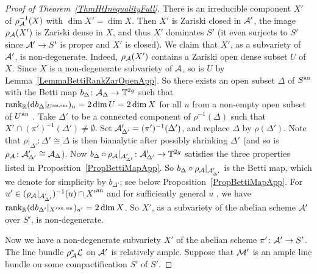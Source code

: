 \begin{proof}[Proof of Theorem~\ref{ThmHtInequalityFull}]
There is  an irreducible component $X'$ of $\rho_{\mathcal{A}}^{-1}(X)$ with
$\dim X' = \dim X$. Then $X'$ is Zariski closed in $\mathcal{A}'$, 
the image $\rho_{\mathcal{A}}(X')$ is Zariski dense in $X$,  and thus $X'$ dominates $S'$ (it even surjects to $S'$
since $\mathcal{A}'\rightarrow S'$ is proper and $X'$ is closed). We
claim that $X'$, as a subvariety of $\mathcal{A}'$, is non-degenerate.
Indeed, $\rho_{\mathcal{A}}(X')$ contains a Zariski open dense subset $U$ of
$X$. Since $X$ is a non-degenerate
subvariety of $\mathcal{A}$, so is $U$ by
Lemma~\ref{LemmaBettiRankZarOpenApp}. So there exists an open subset
$\Delta$ of ${S}^{\mathrm{an}}$ with the Betti map $b_{\Delta} \colon
\mathcal{A}_{\Delta} \rightarrow \mathbb{T}^{2g}$ such that
$\mathrm{rank}_{{\mathbb{R}}}(\mathrm{d}b_{\Delta}|_{{U}^{\mathrm{an,sm}}})_u = 2 \dim U =
2 \dim X$ %
for all $u$ from a non-empty open subset of ${U}^{\mathrm{an}}$
. Take $\Delta'$ to be a connected component of $\rho^{-1}(\Delta)$ such that $X'
\cap (\pi')^{-1}(\Delta') \not= \emptyset$. Set $\mathcal{A}'_{\Delta'} =
(\pi')^{-1}(\Delta')$, and replace $\Delta$ by $\rho(\Delta')$.
Note that $\rho|_{\Delta'}\colon \Delta' \cong \Delta$ is then
bianalytic after possibly shrinking $\Delta'$ (and so is $\rho_{\mathcal{A}}\colon \mathcal{A}'_{\Delta'} \cong
\mathcal{A}_{\Delta}$). Now $b_{\Delta} \circ \rho_{\mathcal{A}}|_{\mathcal{A}'_{\Delta'}} \colon \mathcal{A}'_{\Delta'} \rightarrow \mathbb{T}^{2g}$ satisfies the three properties listed in Proposition~\ref{PropBettiMapApp}. So $b_{\Delta} \circ \rho_{\mathcal{A}}|_{\mathcal{A}'_{\Delta'}}$ is the Betti map, which we denote for simplicity by $b_{\Delta'}$; see below Proposition~\ref{PropBettiMapApp}. 
For $u' \in  (\rho_{\mathcal{A}}|_{\mathcal{A}'_{\Delta'}})^{-1}(u)\cap {X'}^{\mathrm{an}}$
 and for sufficiently general $u$%
, we have 
$\mathrm{rank}_{{\mathbb{R}}}(\mathrm{d}b_{\Delta'}|_{{X'}^{\mathrm{an,sm}}})_{u'} = 2 \dim X$. So $X'$, as a subvariety of the abelian scheme $\mathcal{A}'$ over $S'$, is non-degenerate.

Now we have a non-degenerate subvariety $X'$ of the abelian scheme $\pi' \colon \mathcal{A}' \rightarrow S'$. The line bundle $\rho_{\mathcal{A}}^*{\mathcal L}$ on $\mathcal{A}'$ is relatively ample. Suppose that ${\mathcal M}'$ is an ample line bundle on some compactification $\overline{S'}$ of $S'$.


\end{proof}
